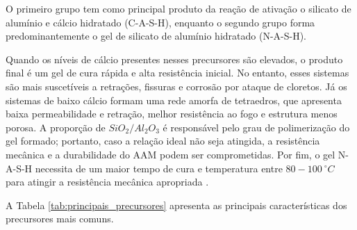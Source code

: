 O primeiro grupo tem como principal produto da reação de ativação o silicato de alumínio e cálcio hidratado (C-A-S-H), enquanto o segundo grupo forma predominantemente o gel de silicato de alumínio hidratado (N-A-S-H).

Quando os níveis de cálcio presentes nesses precursores são elevados, o produto final é um gel de cura rápida e alta resistência inicial. No entanto, esses sistemas são mais suscetíveis a retrações, fissuras e corrosão por ataque de cloretos.
Já os sistemas de baixo cálcio formam uma rede amorfa de tetraedros, que apresenta baixa permeabilidade e retração, melhor resistência ao fogo e estrutura menos porosa.
A proporção de $SiO_2/Al_2O_3$ é responsável pelo grau de polimerização do gel formado; portanto, caso a relação ideal não seja atingida, a resistência mecânica e a durabilidade do AAM podem ser comprometidas.
Por fim, o gel N-A-S-H necessita de um maior tempo de cura e temperatura entre $80-100\ ^\circ C$ para atingir a resistência mecânica apropriada \cite{Nodehi2021}.

A Tabela \ref{tab:principais_precursores} apresenta as principais características dos precursores mais comuns.

